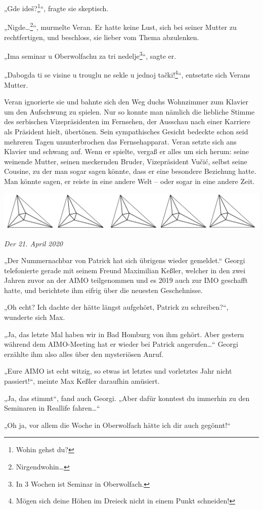 \documentclass[oneside]{memoir}
\newcommand{\parasep}{
\bigskip
\bigskip
\begin{center} 
   \includegraphics[scale=.08]{parasep5.jpg} 
\end{center}
\bigskip
\bigskip
}
\begin{document}
„Gde ideš?\footnote{Wohin gehst du?}“, fragte sie skeptisch.

„Nigde\ldots\footnote{Nirgendwohin\ldots}“, murmelte Veran. Er hatte keine Lust, sich bei seiner Mutter zu rechtfertigen, und beschloss, sie lieber vom Thema abzulenken.

„Ima seminar u Oberwolfachu za tri nedelje\footnote{In 3 Wochen ist Seminar in Oberwolfach.}“, sagte er.

„Dabogda ti se visine u trouglu ne sekle u jednoj tački!\footnote{Mögen sich deine Höhen im Dreieck nicht in einem Punkt schneiden!}“, entsetzte sich Verans Mutter.

Veran ignorierte sie und bahnte sich den Weg duchs Wohnzimmer zum Klavier um den Aufschwung zu spielen. Nur so konnte man nämlich die liebliche Stimme des serbischen Vizepräsidenten im Fernsehen, der Ausschau nach einer Karriere als Präsident hielt, übertönen. Sein sympathisches Gesicht bedeckte schon seid mehreren Tagen ununterbrochen das Fernsehapparat. Veran setzte sich ans Klavier und schwang auf. Wenn er spielte, vergaß er alles um sich herum: seine weinende Mutter, seinen meckernden Bruder, Vizepräsident Vučić, selbst seine Cousine, zu der man sogar sagen könnte, dass er eine besondere Beziehung hatte. Man könnte sagen, er reiste in eine andere Welt -- oder sogar in eine andere Zeit.

\parasep

\textit{Der 21. April 2020}

„Der Nummernachbar von Patrick hat sich übrigens wieder gemeldet.“ Georgi telefonierte gerade mit seinem Freund Maximilian Keßler, welcher in den zwei Jahren zuvor an der AIMO teilgenommen und es 2019 auch zur IMO geschafft hatte, und berichtete ihm eifrig über die neuesten Geschehnisse.

„Oh echt? Ich dachte der hätte längst aufgehört, Patrick zu schreiben?“, wunderte sich Max.
 
„Ja, das letzte Mal haben wir in Bad Homburg von ihm gehört. Aber gestern während dem AIMO-Meeting hat er wieder bei Patrick angerufen\ldots“ Georgi erzählte ihm also alles über den mysteriösen Anruf.

„Eure AIMO ist echt witzig, so etwas ist letztes und vorletztes Jahr nicht passiert!“, meinte Max Keßler daraufhin amüsiert.

„Ja, das stimmt“, fand auch Georgi. „Aber dafür konntest du immerhin zu den Seminaren in Reallife fahren\ldots“

„Oh ja, vor allem die Woche in Oberwolfach hätte ich dir auch gegönnt!“
\end{document}
